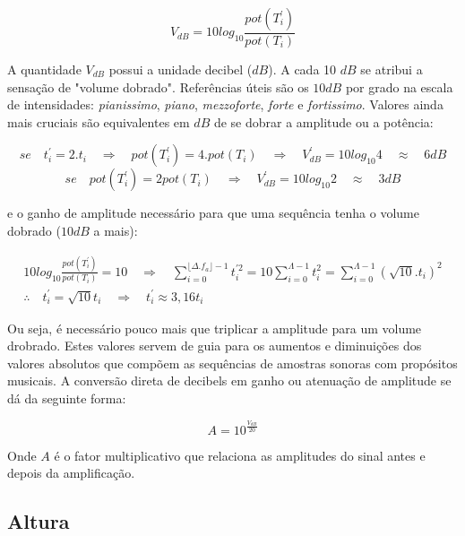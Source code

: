 \begin{equation}\label{decibels}
V_{dB}=10log_{10}\frac{pot(T^{'}_i)}{pot(T_i)}
\end{equation}

A quantidade $V_{dB}$ possui a unidade decibel ($dB$). A cada 10 $dB$ se atribui
a sensação de "volume dobrado". Referências úteis são os $10dB$ por grado na escala
de intensidades: \emph{pianissimo}, \emph{piano}, \emph{mezzoforte}, \emph{forte} e \emph{fortissimo}. Valores ainda
mais cruciais são equivalentes em $dB$ de se dobrar
a amplitude ou a potência:

\begin{equation}\label{eq:ampVol}
se \quad  t_i^{'}=2 . t_i \quad \Rightarrow \quad pot(T^{'}_i)=4 . pot(T_i) \quad \Rightarrow \quad V^{'}_{dB}=10log_{10} 4 \quad  \approx \quad 6 dB
\end{equation}
\begin{equation}\label{eq:potVol}
se \quad pot(T^{'}_i)=2 pot(T_i) \quad \Rightarrow \quad V^{'}_{dB}=10log_{10} 2 \quad \approx \quad 3 dB
\end{equation}

e o ganho de amplitude
necessário para que uma sequência tenha o volume dobrado ($10dB$ a mais):

\begin{align}
10log_{10}\frac{pot(T^{'}_i)}{pot(T_i)} = 10 \quad \Rightarrow \quad \sum_{i=0}^{\lfloor \Delta.f_a \rfloor -1}t^{'2}_i=10\sum_{i=0}^{\Lambda-1}t_i^2=\sum_{i=0}^{\Lambda-1}(\sqrt{10}.t_i)^2 \label{eq:dobraAmp}\\
\therefore \quad t^{'}_i=\sqrt{10}t_i \quad \Rightarrow \quad t^{'}_i \approx 3,16t_i\label{eq:dobraVol}
\end{align}

Ou seja, é necessário pouco mais que triplicar a amplitude para um volume drobrado.
Estes valores servem de guia para os aumentos e diminuições dos valores absolutos que compõem as
sequências de amostras sonoras com propósitos musicais. A conversão direta de decibels
em ganho ou atenuação de amplitude se dá da seguinte forma:

\begin{equation}\label{ampDec}
A = 10^{\frac{V_{dB}}{20}}
\end{equation}

Onde $A$ é o fator multiplicativo que relaciona as amplitudes do sinal antes e depois da amplificação.

\subsection{Altura}

